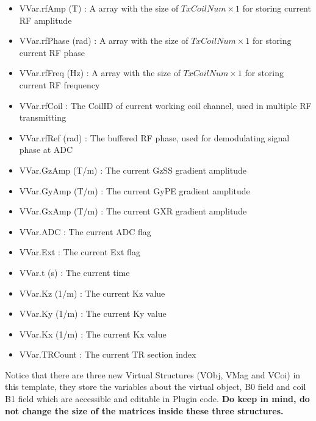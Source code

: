 \documentclass{book}%
\begin{document}
\begin{enumerate}
\begin{itemize}
	\item VVar.rfAmp (T) : A array with the size of $ TxCoilNum \times 1 $ for storing current RF amplitude
	\item VVar.rfPhase (rad) : A array with the size of $ TxCoilNum \times 1 $ for storing current RF phase
	\item VVar.rfFreq (Hz) : A array with the size of $ TxCoilNum \times 1 $ for storing current RF frequency
	\item VVar.rfCoil : The CoilID of current working coil channel, used in multiple RF transmitting
	\item VVar.rfRef (rad) : The buffered RF phase, used for demodulating signal phase at ADC
	\item VVar.GzAmp (T/m) : The current GzSS gradient amplitude
	\item VVar.GyAmp (T/m) : The current GyPE gradient amplitude
	\item VVar.GxAmp (T/m) : The current GXR gradient amplitude
	\item VVar.ADC : The current ADC flag
	\item VVar.Ext : The current Ext flag
	\item VVar.t (s) : The current time
	\item VVar.Kz (1/m) : The current Kz value
	\item VVar.Ky (1/m) : The current Ky value
	\item VVar.Kx (1/m) : The current Kx value
	\item VVar.TRCount : The current TR section index
\end{itemize}


Notice that there are three new Virtual Structures (VObj, VMag and VCoi) in this template, they store the variables about the virtual object, B0 field and coil B1 field which are accessible and editable in Plugin code. \textbf{Do keep in mind, do not change the size of the matrices inside these three structures.}


\end{enumerate}
\end{document}
